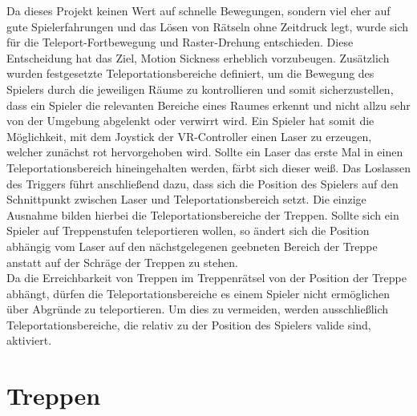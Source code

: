 Da dieses Projekt keinen Wert auf schnelle Bewegungen, sondern viel eher auf gute Spielerfahrungen und das Lösen von Rätseln ohne Zeitdruck legt, wurde sich für die Teleport-Fortbewegung und Raster-Drehung entschieden. Diese Entscheidung hat das Ziel, Motion Sickness erheblich vorzubeugen. Zusätzlich wurden festgesetzte Teleportationsbereiche definiert, um die Bewegung des Spielers durch die jeweiligen Räume zu kontrollieren und somit sicherzustellen, dass ein Spieler die relevanten Bereiche eines Raumes erkennt und nicht allzu sehr von der Umgebung abgelenkt oder verwirrt wird. Ein Spieler hat somit die Möglichkeit, mit dem Joystick der VR-Controller einen Laser zu erzeugen, welcher zunächst rot hervorgehoben wird. Sollte ein Laser das erste Mal in einen Teleportationsbereich hineingehalten werden, färbt sich dieser weiß. Das Loslassen des Triggers führt anschließend dazu, dass sich die Position des Spielers auf den Schnittpunkt zwischen Laser und Teleportationsbereich setzt. Die einzige Ausnahme bilden hierbei die Teleportationsbereiche der Treppen. Sollte sich ein Spieler auf Treppenstufen teleportieren wollen, so ändert sich die Position abhängig vom Laser auf den nächstgelegenen geebneten Bereich der Treppe anstatt auf der Schräge der Treppen zu stehen.\\
Da die Erreichbarkeit von Treppen im Treppenrätsel von der Position der Treppe abhängt, dürfen die Teleportationsbereiche es einem Spieler nicht ermöglichen über Abgründe zu teleportieren. Um dies zu vermeiden, werden ausschließlich Teleportationsbereiche, die relativ zu der Position des Spielers valide sind, aktiviert. 


\section{Treppen}

